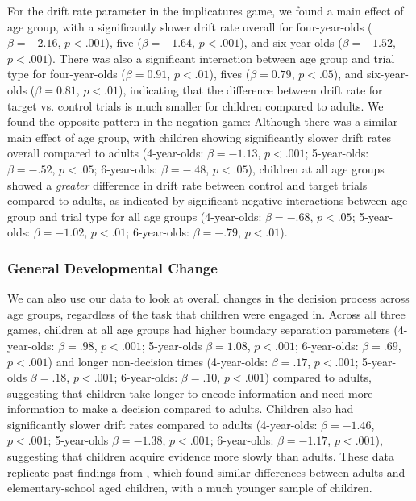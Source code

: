 \documentclass[10pt,letterpaper]{article}
\begin{document}
For the drift rate parameter in the implicatures game, we found a main effect of age group, with a significantly slower drift rate overall for four-year-olds ($\beta = -2.16$, $p < .001$), five ($\beta = -1.64$, $p < .001$), and six-year-olds ($\beta = -1.52$, $p < .001$).  There was also a significant interaction between age group and trial type for four-year-olds ($\beta = 0.91$, $p <.01$), fives ($\beta = 0.79$, $p <.05$), and six-year-olds ($\beta = 0.81$, $p <.01$), indicating that the difference between drift rate for target vs. control trials is much smaller for children compared to adults.  We found the opposite pattern in the negation game: Although there was a similar main effect of age group, with children showing significantly slower drift rates overall compared to adults (4-year-olds: $\beta = -1.13$, $p <.001$; 5-year-olds: $\beta = -.52$, $p <.05$; 6-year-olds: $\beta = -.48$, $p <.05$), children at all age groups showed a \emph{greater} difference in drift rate between control and target trials compared to adults, as indicated by significant negative interactions between age group and trial type for all age groups (4-year-olds: $\beta = -.68$, $p <.05$; 5-year-olds: $\beta = -1.02$, $p <.01$; 6-year-olds: $\beta = -.79$, $p <.01$).  

\subsubsection{General Developmental Change}
We can also use our data to look at overall changes in the decision process across age groups, regardless of the task that children were engaged in. Across all three games, children at all age groups had higher boundary separation parameters (4-year-olds: $\beta = .98$, $p <.001$; 5-year-olds $\beta = 1.08$, $p <.001$; 6-year-olds: $\beta = .69$, $p <.001$) and longer non-decision times (4-year-olds: $\beta = .17$, $p <.001$; 5-year-olds $\beta = .18$, $p <.001$; 6-year-olds: $\beta = .10$, $p <.001$) compared to adults, suggesting that children take longer to encode information and need more information to make a decision compared to adults.  Children also had significantly slower drift rates compared to adults (4-year-olds: $\beta = -1.46$, $p <.001$; 5-year-olds $\beta = -1.38$, $p <.001$; 6-year-olds: $\beta = -1.17$, $p <.001$), suggesting that children acquire evidence more slowly than adults.  These data replicate past findings from , which found similar differences between adults and elementary-school aged children, with a much younger sample of children.  
\end{document}
